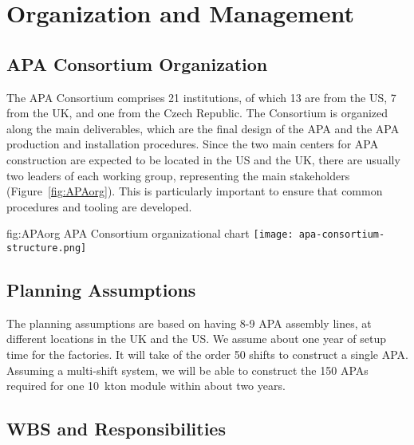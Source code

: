\section{Organization and Management}
\label{sec:fdsp-apa-org}

\subsection{APA Consortium Organization}
\label{sec:fdsp-apa-org-consortium}

The APA Consortium comprises 21 institutions, of which 13 are from the US, 7 from the UK, and one from the Czech Republic. The Consortium is organized along the main deliverables, which are the final design of the APA and the APA production and installation procedures. Since the two main centers for APA construction are expected to be located in the US and the UK, there are usually two leaders of each working group, representing the main stakeholders (Figure~\ref{fig:APAorg}). This is particularly important to ensure that common procedures and tooling are developed. 

\begin{dunefigure}{fig:APAorg}
{APA Consortium organizational chart}
\texttt{[image: apa-consortium-structure.png]}
\end{dunefigure}


\subsection{Planning Assumptions}
\label{sec:fdsp-apa-org-assmp}

The planning assumptions are based on having 8-9 APA assembly lines, at different locations in the UK and the US. 
We assume about one year of setup time for the factories.
It will take of the order 50 shifts to construct a single APA. Assuming a multi-shift system, we will be able to construct the 150 APAs required for one \SI{10}{kton} module within about two years.

\subsection{WBS and Responsibilities}
\label{sec:fdsp-apa-org-wbs}

